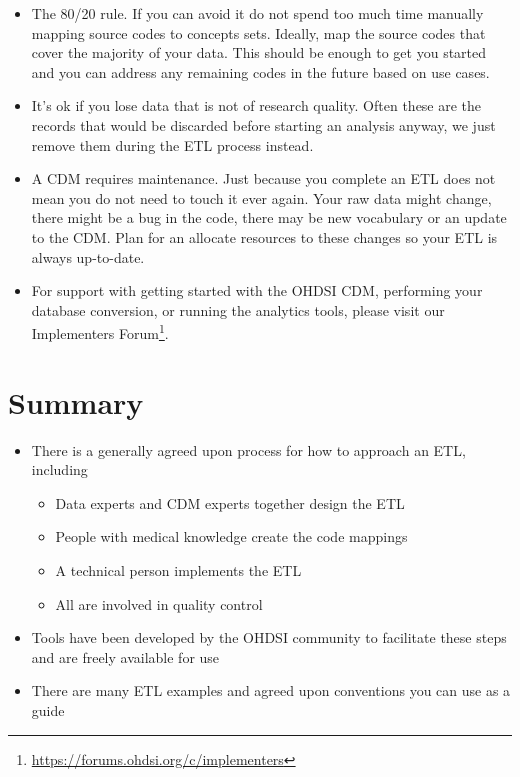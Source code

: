 \documentclass[11pt]{book}
\providecommand{\tightlist}{%
  \setlength{\itemsep}{0pt}\setlength{\parskip}{0pt}}
\let\rmarkdownfootnote\footnote%
\def\footnote{\protect\rmarkdownfootnote}
\theoremstyle{definition}
\theoremstyle{definition}
\theoremstyle{definition}
\theoremstyle{remark}
\let\BeginKnitrBlock\begin \let\EndKnitrBlock\end
\begin{document}
\begin{itemize}
\tightlist
\item
  The 80/20 rule. If you can avoid it do not spend too much time manually mapping source codes to concepts sets. Ideally, map the source codes that cover the majority of your data. This should be enough to get you started and you can address any remaining codes in the future based on use cases.
\item
  It's ok if you lose data that is not of research quality. Often these are the records that would be discarded before starting an analysis anyway, we just remove them during the ETL process instead.
\item
  A CDM requires maintenance. Just because you complete an ETL does not mean you do not need to touch it ever again. Your raw data might change, there might be a bug in the code, there may be new vocabulary or an update to the CDM. Plan for an allocate resources to these changes so your ETL is always up-to-date.
\item
  For support with getting started with the OHDSI CDM, performing your database conversion, or running the analytics tools, please visit our Implementers Forum\footnote{\url{https://forums.ohdsi.org/c/implementers}}.
\end{itemize}

\hypertarget{summary-3}{%
\section{Summary}\label{summary-3}}

\BeginKnitrBlock{rmdsummary}
\begin{itemize}
\item
  There is a generally agreed upon process for how to approach an ETL, including

  \begin{itemize}
  \tightlist
  \item
    Data experts and CDM experts together design the ETL
  \item
    People with medical knowledge create the code mappings
  \item
    A technical person implements the ETL
  \item
    All are involved in quality control
  \end{itemize}
\item
  Tools have been developed by the OHDSI community to facilitate these steps and are freely available for use
\item
  There are many ETL examples and agreed upon conventions you can use as a guide
\end{itemize}
\EndKnitrBlock{rmdsummary}
\end{document}
